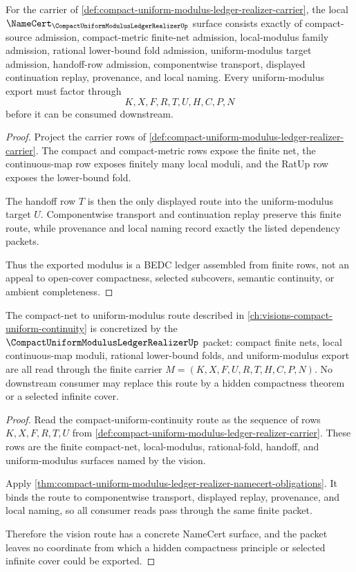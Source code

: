 \begin{theorem}
\label{thm:compact-uniform-modulus-ledger-realizer-namecert-obligations}
For the carrier of \autoref{def:compact-uniform-modulus-ledger-realizer-carrier}, the local $\NameCert_{\CompactUniformModulusLedgerRealizerUp}$ surface consists exactly of compact-source admission, compact-metric finite-net admission, local-modulus family admission, rational lower-bound fold admission, uniform-modulus target admission, handoff-row admission, componentwise transport, displayed continuation replay, provenance, and local naming. Every uniform-modulus export must factor through
$$
K,X,F,R,T,U,H,C,P,N
$$
before it can be consumed downstream.
\end{theorem}
\begin{proof}
Project the carrier rows of \autoref{def:compact-uniform-modulus-ledger-realizer-carrier}. The compact and compact-metric rows expose the finite net, the continuous-map row exposes finitely many local moduli, and the RatUp row exposes the lower-bound fold.

The handoff row $T$ is then the only displayed route into the uniform-modulus target $U$. Componentwise transport and continuation replay preserve this finite route, while provenance and local naming record exactly the listed dependency packets.

Thus the exported modulus is a BEDC ledger assembled from finite rows, not an appeal to open-cover compactness, selected subcovers, semantic continuity, or ambient completeness.
\end{proof}

\begin{theorem}
\label{thm:compact-uniform-modulus-ledger-realizer-vision-handoff}
The compact-net to uniform-modulus route described in \autoref{ch:visions-compact-uniform-continuity} is concretized by the $\CompactUniformModulusLedgerRealizerUp$ packet: compact finite nets, local continuous-map moduli, rational lower-bound folds, and uniform-modulus export are all read through the finite carrier $M=(K,X,F,U,R,T,H,C,P,N)$. No downstream consumer may replace this route by a hidden compactness theorem or a selected infinite cover.
\end{theorem}
\begin{proof}
Read the compact-uniform-continuity route as the sequence of rows $K,X,F,R,T,U$ from \autoref{def:compact-uniform-modulus-ledger-realizer-carrier}. These rows are the finite compact-net, local-modulus, rational-fold, handoff, and uniform-modulus surfaces named by the vision.

Apply \autoref{thm:compact-uniform-modulus-ledger-realizer-namecert-obligations}. It binds the route to componentwise transport, displayed replay, provenance, and local naming, so all consumer reads pass through the same finite packet.

Therefore the vision route has a concrete NameCert surface, and the packet leaves no coordinate from which a hidden compactness principle or selected infinite cover could be exported.
\end{proof}

